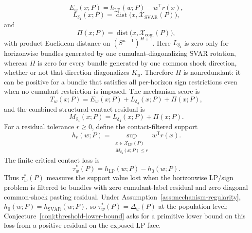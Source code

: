 \documentclass[11pt]{article}
\newcommand{\transpose}{\mathsf{T}}
\theoremstyle{definition}
\theoremstyle{plain}
\theoremstyle{remark}
\begin{document}
\[
E_w(x;P)=h_{\mathrm{LP}}(w;P)-w^\transpose r(x),
\]
\[
L_{\delta_4}(x;P)=\operatorname{dist}\bigl(x,\mathcal X_{\mathrm{SVAR}}(P)\bigr),
\]
and
\[
\Pi(x;P)=\operatorname{dist}\bigl(x,\mathcal X_{\mathrm{com}}(P)\bigr),
\]
with product Euclidean distance on \((S^{n-1})^{H+1}\).  Here \(L_{\delta_4}\) is zero only for horizonwise bundles generated by one cumulant-diagonalizing SVAR rotation, whereas \(\Pi\) is zero for every bundle generated by one common shock direction, whether or not that direction diagonalizes \(K_u\).  Therefore \(\Pi\) is nonredundant: it can be positive for a bundle that satisfies all per-horizon sign restrictions even when no cumulant restriction is imposed.  The mechanism score is
\[
T_w(x;P)=E_w(x;P)+L_{\delta_4}(x;P)+\Pi(x;P),
\]
and the combined structural-contact residual is
\[
M_{\delta_4}(x;P)=L_{\delta_4}(x;P)+\Pi(x;P).
\]
For a residual tolerance \(r\ge0\), define the contact-filtered support
\[
h_r(w;P)=
\sup_{\substack{x\in\mathcal X_{\mathrm{LP}}(P)\\ M_{\delta_4}(x;P)\le r}}
w^\transpose r(x).
\]
The finite critical contact loss is
\[
\tau_w^*(P)=h_{\mathrm{LP}}(w;P)-h_0(w;P).
\]
Thus \(\tau_w^*(P)\) measures the support value lost when the horizonwise LP/sign problem is filtered to bundles with zero cumulant-label residual and zero diagonal common-shock pasting residual.  Under Assumption~\ref{ass:mechanism-regularity}, \(h_0(w;P)=h_{\mathrm{SVAR}}(w;P)\), so \(\tau_w^*(P)=\Delta_w(P)\) at the population level; Conjecture~\ref{conj:threshold-lower-bound} asks for a primitive lower bound on this loss from a positive residual on the exposed LP face.
\end{document}
